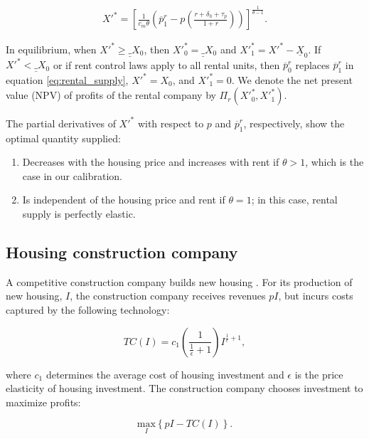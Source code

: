 \documentclass[parskip=full]{article}
\begin{document}
\begin{align}\label{eq:rental_supply}
X'^{*}=\left[\frac{1}{c_{m}\theta}\left(\overline{p}^{r}_{1}-p\left(\frac{r+\delta_{h}+\tau_{p}}{1+r}\right)\right)\right]^{\frac{1}{\theta-1}}.
\end{align}

\noindent In equilibrium, when $X'^{*}\geq \underline_{X}_{0}$, then $X'^{*}_{0}=\underline_{X}_{0}$ and $X'^{*}_{1}=X'^{*}-\underline{X}_{0}$. If $X'^{*}<\underline_{X}_{0}$ or if rent control laws apply to all rental units, then $\overline{p}^{r}_{0}$ replaces $\overline{p}^{r}_{1}$ in equation \ref{eq:rental_supply}, $X'^{*}=X_{0}$, and $X'^{*}_{1}=0$. We denote the net present value (NPV) of profits of the rental company by $\Pi_{r}(X'^{*}_{0},X'^{*}_{1})$.

\noindent The partial derivatives of $X'^{*}$ with respect to $p$ and $\overline{p}^{r}_{1}$, respectively, show the optimal quantity supplied:

\begin{enumerate}
    \item Decreases with the housing price and increases with rent if $\theta>1$, which is the case in our calibration.
    \item Is independent of the housing price and rent if $\theta=1$; in this case, rental supply is perfectly elastic.
\end{enumerate}

\subsection{Housing construction company}\label{sec:construction_company}

A competitive construction company builds new housing \citep{rotberg-2022}. For its production of new housing, $I$, the construction company receives revenues $pI$, but incurs costs captured by the following technology:

\begin{equation*}
TC(I)=c_{1}\left(\frac{1}{\frac{1}{\epsilon}+1}\right)I^{\frac{1}{\epsilon}+1}\label{eq:total_cost_structure},
\end{equation*}

\noindent where $c_1$ determines the average cost of housing investment and $\epsilon$ is the price elasticity of housing investment. The construction company chooses investment to maximize profits:

\begin{equation*}
\label{eq:construction_company_profits}
\underset{I} {\text{$\mbox{max} $}}{\left\{p I-TC(I)\right\}}.
\end{equation*}
\end{document}
